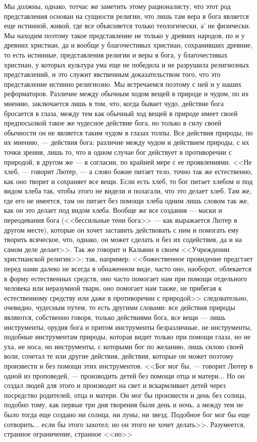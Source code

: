 \documentclass[12pt]{article}
\begin{document}
Мы должны, однако, тотчас же заметить этому рационалисту, что этот род представления основан на сущности религии, что лишь там вера в бога является еще истинной, живой, где все объясняется только теологически, а' не физически. Мы находим поэтому такое представление не только у древних народов, по и у древних христиан, да и вообще у благочестивых христиан, сохранивших древние, то есть истинные, представления религии и веры в бога, у благочестивых христиан, у которых культура ума еще не победила и не разрушила религиозных представлений, и это служит явственным доказательством того, что это представление истинно религиозно. Мы встречаемся поэтому с ней и у наших реформаторов. Различие между обычным ходом вещей в природе и чудом, по их мнению, заключается лишь в том, что, когда бывает чудо, действие бога бросается в глаза, между тем как обычный ход вещей в природе имеет своей предпосылкой такое же чудесное действие бога, но только в силу своей обычности он не является таким чудом в глазах толпы. Все действия природы, по их мнению, --- действия бога; различие между чудом и действием природы, с их точки зрения, лишь то, что в одном случае бог действует в противоречии с природой, в другом же --- в согласии, по крайней мере с ее проявлениями. <<Не хлеб, --- говорит Лютер, --- а слово божие питает тело, точно так же естественно, как оно творит и сохраняет все вещи. Если есть хлеб, то бог питает хлебом и под видом хлеба так, чтобы этого не видели и полагали, что это делает хлеб. Там же, где его не имеется, там он питает без помощи хлеба одним лишь словом так же, как он это делает под видом хлеба. Вообще же все создания --- маски и переодевания бога (<<бессильные тени бога>>  --- как выражается Лютер в другом месте), которые он хочет заставить действовать с ним и помогать ему творить всяческое, что, однако, он может сделать и без их содействия, да и на самом деле делает>>. Так же говорит и Кальвин в своем <<Учреждении христианской религии>>; так, например: <<божественное провидение предстает перед нами далеко не всегда в обнаженном виде, часто оно, наоборот, облекается в форму естественных средств, оно часто помогает нам при помощи отдельного человека или неразумной твари, оно помогает нам также, не прибегая к естественному средству или даже в противоречии с природой>>  следовательно, очевидно, чудесным путем, то есть другими словами: все действия природы являются, собственно говоря, только действиями бога, все вещи --- лишь инструменты, орудия бога и притом инструменты безразличные, не инструменты, подобные инструментам природы, которая видит только при помощи глаза, но не уха, не носа, но инструменты, с которыми бог по желанию, лишь силою своей воли, сочетал те или другие действия, действия, которые он может поэтому произвести и без помощи этих инструментов. <<Бог мог бы, --- говорит Лютер в одной из проповедей, --- производить детей без помощи отца и матери... Но он создал людей для этого и производит на свет и вскармливает детей через посредство родителей, отца и матери. Он мог бы произвести и день без солнца, подобно тому, как первые три дня творения были день и ночь, а между тем не было тогда еще создано ни солнца, ни луны, ни звезд. Подобное бог мог бы еще сотворить... если бы этого захотел; но он этого не хочет делать>>. Разумеется, странное ограничение, странное <<но>>  
\end{document}
